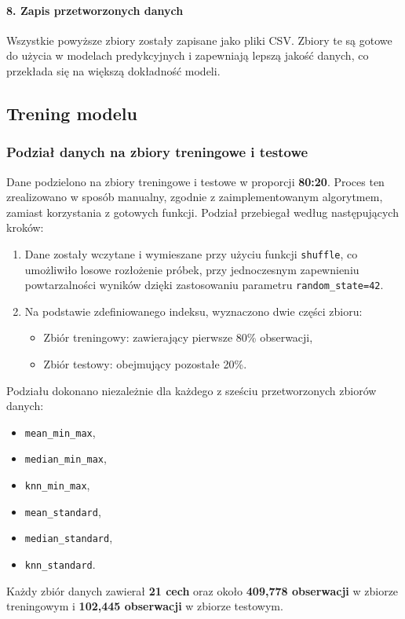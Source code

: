 \documentclass[10pt,letterpaper]{article}
\begin{document}
\paragraph{8. Zapis przetworzonych danych}
Wszystkie powyższe zbiory zostały zapisane jako pliki CSV. Zbiory te są gotowe do użycia w modelach predykcyjnych i zapewniają lepszą jakość danych, co przekłada się na większą dokładność modeli.

\subsection{Trening modelu}
\subsubsection{Podział danych na zbiory treningowe i testowe}
Dane podzielono na zbiory treningowe i testowe w proporcji \textbf{80:20}. Proces ten zrealizowano w sposób manualny, zgodnie z zaimplementowanym algorytmem, zamiast korzystania z gotowych funkcji. Podział przebiegał według następujących kroków:
\begin{enumerate}
	\item Dane zostały wczytane i wymieszane przy użyciu funkcji \texttt{shuffle}, co umożliwiło losowe rozłożenie próbek, przy jednoczesnym zapewnieniu powtarzalności wyników dzięki zastosowaniu parametru \texttt{random\_state=42}.
	\item Na podstawie zdefiniowanego indeksu, wyznaczono dwie części zbioru:
	\begin{itemize}
		\item Zbiór treningowy: zawierający pierwsze 80\% obserwacji,
		\item Zbiór testowy: obejmujący pozostałe 20\%.
	\end{itemize}
\end{enumerate}
Podziału dokonano niezależnie dla każdego z sześciu przetworzonych zbiorów danych:

\begin{itemize}
	\item \texttt{mean\_min\_max},
	\item \texttt{median\_min\_max},
	\item \texttt{knn\_min\_max},
	\item \texttt{mean\_standard},
	\item \texttt{median\_standard},
	\item \texttt{knn\_standard}.
\end{itemize}
Każdy zbiór danych zawierał \textbf{21 cech} oraz około \textbf{409,778 obserwacji} w zbiorze treningowym i \textbf{102,445 obserwacji} w zbiorze testowym.
\end{document}
